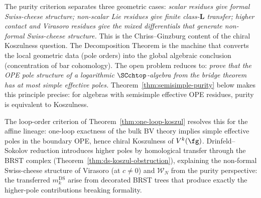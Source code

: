 \begin{remark}
\label{rem:simple-pole-principle}
The purity criterion separates three geometric cases:
\emph{scalar residues give formal Swiss-cheese structure; non-scalar
Lie residues give finite class-$\mathbf L$ transfer; higher contact
and Virasoro residues give the mixed differentials that generate
non-formal Swiss-cheese structure.}
This is the Chriss--Ginzburg content of the chiral Koszulness
question. The Decomposition Theorem is the machine that converts
the local geometric data (pole orders) into the global algebraic
conclusion (concentration of bar cohomology). The open problem
reduces to: \emph{prove that the OPE pole structure of a logarithmic
$\SCchtop$-algebra from the bridge theorem has at most simple
effective poles.} Theorem~\ref{thm:semisimple-purity} below
makes this principle precise: for algebras with semisimple effective
OPE residues, purity is equivalent to Koszulness.

The loop-order criterion of
Theorem~\ref{thm:one-loop-koszul} resolves this for the
affine lineage: one-loop exactness of the bulk BV theory implies
simple effective poles in the boundary OPE, hence chiral Koszulness
of $V^k(\fg)$.
Drinfeld--Sokolov reduction introduces higher poles by homological
transfer through the BRST complex
(Theorem~\ref{thm:ds-koszul-obstruction}), explaining the
non-formal Swiss-cheese structure of Virasoro (at $c \neq 0$) and
$\mathcal{W}_N$ from the purity perspective: the transferred
$m_k^{\mathrm{DS}}$ arise from decorated BRST trees that produce
exactly the higher-pole contributions breaking formality.
\end{remark}

